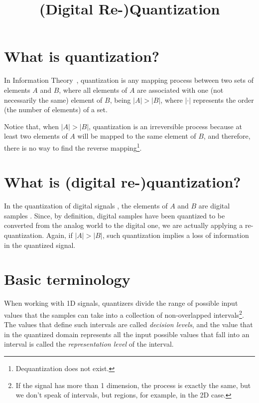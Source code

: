 



\title{(Digital Re-)Quantization}

\maketitle

\tableofcontents

\section{What is quantization?}

In Information Theory~\cite{vruiz__information_theory}, quantization
\cite{vruiz__signal_quantization,vruiz__scalar_quantization,vruiz__vector_quantization,vruiz__trellis_quantization}
is any mapping process between two sets of elements $A$ and $B$, where
all elements of $A$ are associated with one (not necessarily the same)
element of $B$, being $|A|>|B|$, where $|\cdot|$ represents the order
(the number of elements) of a set.

Notice that, when $|A|>|B|$, quantization is an irreversible process
because at least two elements of $A$ will be mapped to the same
element of $B$, and therefore, there is no way to find the reverse
mapping\footnote{Dequantization does not exist.}.

\section{What is (digital re-)quantization?}

In the quantization of digital signals
\cite{vruiz__scalar_quantization,vruiz__vector_quantization}, the
elements of $A$ and $B$ are digital samples
\cite{vruiz__signal_quantization}. Since, by definition, digital
samples have been quantized to be converted from the analog world to
the digital one, we are actually applying a re-quantization. Again, if
$|A|>|B|$, such quantization implies a loss of information in the
quantized signal.

\section{Basic terminology}

When working with 1D signals, quantizers divide the range of possible
input values that the samples can take into a collection of
non-overlapped intervals\footnote{If the signal has more than 1
  dimension, the process is exactly the same, but we don't speak of
  intervals, but regions, for example, in the 2D case.}. The values
that define such intervals are called \emph{decision levels}, and the
value that in the quantized domain represents all the input possible
values that fall into an interval is called the \emph{representation
  level} of the interval.

